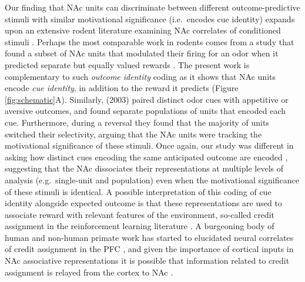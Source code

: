 \documentclass[11pt]{article}
\let\cite=\citep
\providecommand{\DIFadd}[1]{{\protect\color{red} \sf #1}} %
\providecommand{\DIFdel}[1]{} %
\providecommand{\DIFaddbegin}{} %
\providecommand{\DIFaddend}{} %
\providecommand{\DIFdelbegin}{} %
\providecommand{\DIFdelend}{} %
\newcommand{\DIFscaledelfig}{0.5}
\newlength{\DIFdelgraphicswidth} %
\newlength{\DIFdelgraphicsheight} %
\newcommand{\DIFaddincludegraphics}[2][]{{\color{red}\fbox{\DIFOincludegraphics[#1]{#2}}}} %
\newcommand{\DIFdelincludegraphics}[2][]{%
\sbox{\DIFdelgraphicsbox}{\DIFOincludegraphics[#1]{#2}}%
\settoboxwidth{\DIFdelgraphicswidth}{\DIFdelgraphicsbox} %
\settoboxtotalheight{\DIFdelgraphicsheight}{\DIFdelgraphicsbox} %
\scalebox{\DIFscaledelfig}{%
\parbox[b]{\DIFdelgraphicswidth}{\usebox{\DIFdelgraphicsbox}\\[-\baselineskip] \rule{\DIFdelgraphicswidth}{0em}}\llap{\resizebox{\DIFdelgraphicswidth}{\DIFdelgraphicsheight}{%
\setlength{\unitlength}{\DIFdelgraphicswidth}%
\begin{picture}(1,1)%
\thicklines\linethickness{2pt} %
{\color[rgb]{1,0,0}\put(0,0){\framebox(1,1){}}}%
{\color[rgb]{1,0,0}\put(0,0){\line( 1,1){1}}}%
{\color[rgb]{1,0,0}\put(0,1){\line(1,-1){1}}}%
\end{picture}%
}\hspace*{3pt}}} %
} %
\DeclareRobustCommand{\DIFaddbegin}{\DIFOaddbegin \let\includegraphics\DIFaddincludegraphics} %
\DeclareRobustCommand{\DIFaddend}{\DIFOaddend \let\includegraphics\DIFOincludegraphics} %
\DeclareRobustCommand{\DIFdelbegin}{\DIFOdelbegin \let\includegraphics\DIFdelincludegraphics} %
\DeclareRobustCommand{\DIFdelend}{\DIFOaddend \let\includegraphics\DIFOincludegraphics} %
\begin{document}
Our finding that NAc units can discriminate between different outcome-predictive stimuli with similar motivational significance (i.e.\ encodes cue identity) expands upon an extensive rodent literature examining NAc correlates of conditioned stimuli \cite{Setlow2003,Nicola2004,Yun2004,Roitman2005,Day2006,Ambroggi2008,Ishikawa2008,Roesch2009a,Saddoris2011,Goldstein2012,Lansink2012,Bissonette2013,McGinty2013,Atallah2014,Sugam2014,Cooch2015,West2016,Dejean2017}. Perhaps the most comparable work in rodents comes from a study that found \DIFdelbegin \DIFdel{distinct coding }\DIFdelend \DIFaddbegin \DIFadd{a subset of NAc units that modulated their firing }\DIFaddend for an odor when it predicted separate but equally valued rewards \cite{Cooch2015}. The present work is complementary to such {\it outcome identity} coding as it shows that NAc units encode {\it cue identity}, \DIFdelbegin \DIFdel{both separately and integrated with }\DIFdelend \DIFaddbegin \DIFadd{in addition to }\DIFaddend the reward it predicts (\DIFdelbegin \DIFdel{H2 and H3 in }\DIFdelend Figure \ref{fig:schematic}A). Similarly, \citeauthor{Setlow2003} (2003) paired distinct \DIFaddbegin \DIFadd{odor }\DIFaddend cues with appetitive or aversive outcomes, and found separate populations of units that encoded each cue. \DIFaddbegin \DIFadd{Furthermore, during a reversal they found that the majority of units switched their selectivity, arguing that the NAc units were tracking the motivational significance of these stimuli. }\DIFaddend Once again, our study was different in asking how distinct cues encoding the same anticipated outcome are encoded\DIFdelbegin \DIFdel{. Such cue identity
encoding suggests that even when the biological relevance of these
stimuli is similar, }\DIFdelend \DIFaddbegin \DIFadd{, suggesting that the }\DIFaddend NAc dissociates their representations at \DIFdelbegin \DIFdel{the level
of the single-units}\DIFdelend \DIFaddbegin \DIFadd{multiple levels of analysis (e.g.\ single-unit and population) even when the motivational significance of these stimuli is identical}\DIFaddend . A possible interpretation of this coding of cue \DIFdelbegin \DIFdel{features }\DIFdelend \DIFaddbegin \DIFadd{identity }\DIFaddend alongside expected outcome is that these representations are used to associate reward with relevant features of the environment, so-called credit assignment in the reinforcement learning literature \cite{sutton1998}. A burgeoning body of human and non-human primate work has started to elucidated neural correlates of credit assignment in the PFC \DIFdelbegin \DIFdel{, particularly in the lateral orbitofrontal cortex
\cite{Chau2015,Akaishi2016,Asaad2017,Noonan2017}. Given the }\DIFdelend \DIFaddbegin \DIFadd{\cite{Chau2015,Akaishi2016,Asaad2017,Noonan2017}, and given the }\DIFaddend importance of cortical inputs in NAc associative representations \DIFdelbegin \DIFdel{, }\DIFdelend it is possible that information related to credit assignment is relayed from the cortex to NAc \cite{Ishikawa2008,Cooch2015}.
\end{document}
